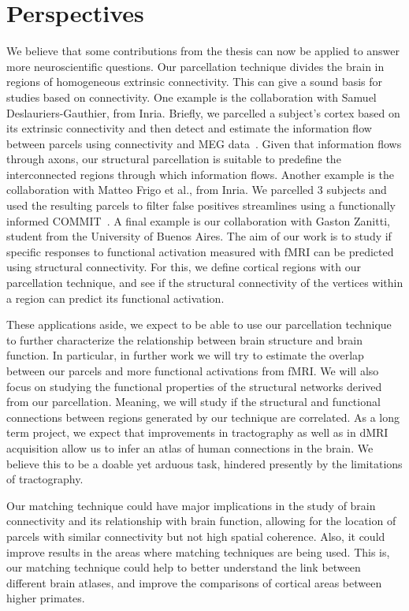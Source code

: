 \section{Perspectives}

We believe that some contributions from the thesis can now be applied
to answer more neuroscientific questions. Our parcellation technique divides
the brain in regions of homogeneous extrinsic connectivity. This can give
a sound basis for studies based on connectivity. One example is the collaboration
with Samuel Deslauriers-Gauthier, from Inria. Briefly, we parcelled a subject's
cortex based on its extrinsic connectivity and then detect and estimate the information
flow between parcels using connectivity and MEG data~\cite{Gallardo2017b}.
Given that information flows through axons, our structural parcellation is suitable to predefine the
interconnected regions through which information flows. Another example is the
collaboration with Matteo Frigo et al., from Inria. We parcelled 3 subjects
and used the resulting parcels to filter false positives streamlines using a
functionally informed COMMIT~\cite{Frigo2018}. A final example is our collaboration
with Gaston Zanitti, student from the University of Buenos Aires. The aim of
our work is to study if specific responses to functional activation measured
with fMRI can be predicted using structural connectivity. For this, we define
cortical regions with our parcellation technique, and see if the structural
connectivity of the vertices within a region can predict its functional activation.

These applications aside, we expect to be able to use our parcellation technique to
further characterize the relationship between brain structure and brain function.
In particular, in further work we will try to estimate the overlap between
our parcels and more functional activations from fMRI. We will also focus on
studying the functional properties of the structural networks derived from
our parcellation. Meaning, we will study if the structural and functional
connections between regions generated by our technique are correlated. 
As a long term project, we expect that improvements in tractography as well as
in dMRI acquisition allow us to infer an atlas of human connections in the brain.
We believe this to be a doable yet arduous task, hindered presently by the
limitations of tractography.

Our matching technique could have major implications in the study of brain
connectivity and its relationship with brain function, allowing for the location
of parcels with similar connectivity but not high spatial coherence. Also, it
could improve results in the areas where matching techniques are
being used. This is, our matching technique could help to better understand
the link between different brain atlases, and improve the comparisons of cortical
areas between higher primates.

